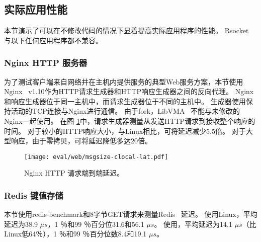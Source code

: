 \subsection{实际应用性能}
\label{socksdirect:subsec:application}


本节演示了\sys {}可以在不修改代码的情况下显着提高实际应用程序的性能。
Rsocket~ \cite {rsockets}与以下任何应用程序都不兼容。

\subsubsection{Nginx HTTP 服务器}



为了测试客户端来自网络并在主机内提供服务的典型Web服务方案，本节使用Nginx~ \cite {nginx} v1.10作为HTTP请求生成器和HTTP响应生成器之间的反向代理。
Nginx和响应生成器位于同一主机中，而请求生成器位于不同的主机中。
生成器使用保持活动的TCP连接与Nginx进行通信。
由于fork，LibVMA~ \cite {libvma}不能与未修改的Nginx一起使用。
在图 \ref {socksdirect:fig:eval-nginx}中，请求生成器测量从发送HTTP请求到接收整个响应的时间。
对于较小的HTTP响应大小，与Linux相比，\sys {}可将延迟减少5.5倍。
对于大型响应，由于零拷贝，\sys {}可将延迟降低多达20倍。

\begin{figure}[htbp]
	\centering \texttt{[image: eval/web/msgsize-clocal-lat.pdf]}
	
	\caption{Nginx HTTP 请求端到端延迟。}
	\label{socksdirect:fig:eval-nginx}
\end{figure}



\subsubsection{Redis 键值存储}

本节使用redis-benchmark和8字节GET请求来测量Redis~ \cite {redis}延迟。
使用Linux，平均延迟为38.9 $ \mu s $，1 ％和99 ％百分位31.6和56.1 $ \mu s $。
使用\sys {}，平均延迟为14.1 $ \mu s $（比Linux低64％），1 ％和99 ％百分位数8.4和19.1 $ \mu s $。


